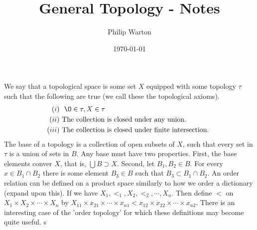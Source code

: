 \documentclass{article}
\theoremstyle{definition}
\begin{document}
\title{General Topology - Notes}
\author{Philip Warton}
\date{\today}
\maketitle
We say that a topological space is some set $X$ equipped with some topology $\tau$ such that the following
are true (we call these the topological axioms).
\begin{align*}
    (i) & \ \ \O \in \tau, X \in \tau \\
    (ii) & \text{ The collection is closed under any union.} \\
    (iii) & \text{ The collection is closed under finite intersection. }
\end{align*}
The base of a topology is a collection of open subsets of $X$, such that 
every set in $\tau$ is a union of sets in $B$. Any base must have two properties.
First, the base elements conver $X$, that is, $\bigcup B \supset X$.
Second, let $B_1, B_2 \in B$. For every $x \in B_1 \cap B_2$ there is some element $B_3 \in B$ such
that $B_3 \subset B_1 \cap B_2$. An order relation can be defined on a product space similarly
to how we order a dictionary (expand upon this).
If we have $X_1, <_1, X_2, <_2, \cdots , X_n$. Then define 
$<$ on $X_1 \times X_2 \times \cdots \times X_n$ by 
$X_{11} \times x_{21} \times \cdots \times x_{n1} < x_{12} \times x_{22} \times \cdots \times x_{n2}$.
There is an interesting case of the 'order topology' for which these definitions may become quite useful.
s
\end{document}
